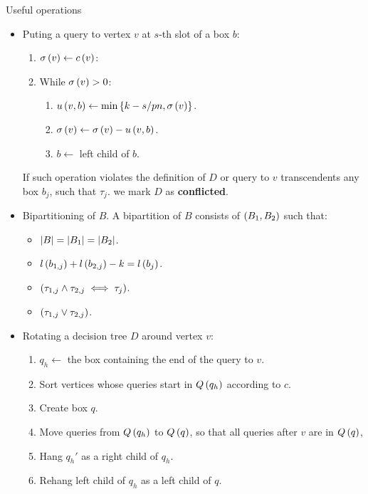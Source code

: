 \begin{frame}[allowframebreaks]{Useful operations}
\begin{itemize}
    \item Puting a query to vertex $v$ at $s$-th slot of a box $b$:
    \begin{enumerate}
        \item $\sigma\left( v \right)\gets c\left( v \right)$: 
        \item While $\sigma\left( v \right)>0$: 
        \begin{enumerate}
            \item $u\left( v, b \right)\gets\min\left\{ k-s/pn, \sigma\left( v \right) \right\}$.
            \item $\sigma\left( v \right)\gets \sigma\left( v \right)-u\left( v, b \right)$. 
            \item$b\gets$ left child of $b$.
        \end{enumerate}
    \end{enumerate} If such operation violates the definition of $D$ or query to $v$ transcendents any box $b_j$, such that $\tau_j$. we mark $D$ as \textbf{conflicted}. 
    \framebreak
    \item Bipartitioning of $B$. A bipartition of $B$ consists of $\left( B_1,B_2 \right)$ such that:
    \begin{itemize}
        \item $\left| B \right|=\left| B_1 \right|=\left| B_2 \right|$.
        \item $l\left( b_{1,j} \right)+l\left( b_{2,j} \right) - k = l\left( b_j \right)$.
        \item $\left( \tau_{1,j}\land \tau_{2,j} \iff \tau_{j} \right)$.
        \item$\left( \tau_{1,j}\lor \tau_{2,j} \right)$.
    \end{itemize} 
    \framebreak
    \item Rotating a decision tree $D$ around vertex $v$: 
    \begin{enumerate}
        \item $q_h\gets $ the box containing the end of the query to $v$.
        \item Sort vertices whose queries start in $Q\left( q_h \right)$ according to $c$.
        \item Create box $q$.
        \item Move queries from $Q\left( q_h \right)$ to $Q\left( q \right)$, so that all queries after $v$ are in $Q\left( q \right)$,
        \item Hang $q_h'$ as a right child of $q_h$.
        \item Rehang left child of $q_h$ as a left child of $q$. 
    \end{enumerate}
\end{itemize}
\end{frame}

